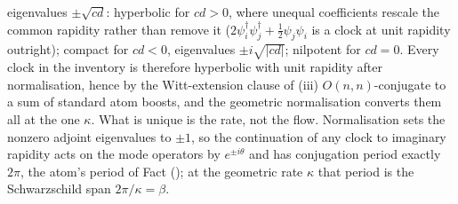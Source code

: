 eigenvalues $\pm\sqrt{cd}$: hyperbolic for $cd > 0$, where unequal coefficients rescale the common rapidity rather than remove it ($2\psi_i^\dagger\psi_j^\dagger + \tfrac12\psi_j\psi_i$ is a clock at unit rapidity outright); compact for $cd < 0$, eigenvalues $\pm i\sqrt{|cd|}$; nilpotent for $cd = 0$. Every clock in the inventory is therefore hyperbolic with unit rapidity after normalisation, hence by the Witt-extension clause of (iii) $O(n,n)$-conjugate to a sum of standard atom boosts, and the geometric normalisation converts them all at the one $\kappa$. What is unique is the rate, not the flow. Normalisation sets the nonzero adjoint eigenvalues to $\pm 1$, so the continuation of any clock to imaginary rapidity acts on the mode operators by $e^{\pm i\theta}$ and has conjugation period exactly $2\pi$, the atom's period of Fact  (\cite[Prop.~7.21(1)]{ButlerT5}); at the geometric rate $\kappa$ that period is the Schwarzschild span $2\pi/\kappa = \beta$.
